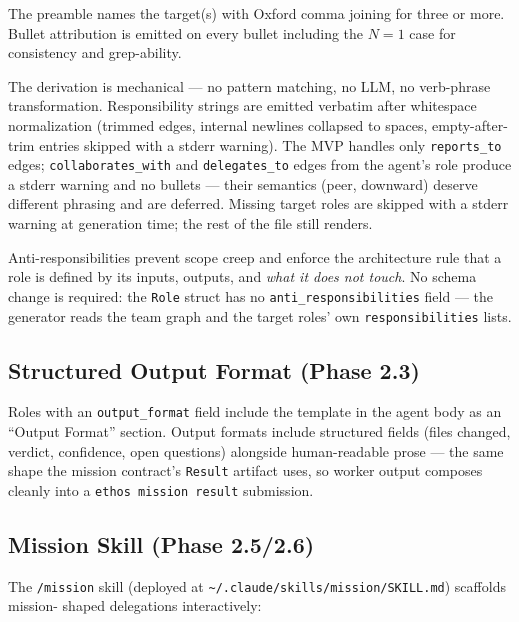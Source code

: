 \documentclass[a4paper,10pt]{article}
\newcommand{\field}[1]{\texttt{#1}}
\newcommand{\cmd}[1]{\texttt{#1}}
\newcommand{\fpath}[1]{\texttt{#1}}
\begin{document}
The preamble names the target(s) with Oxford comma joining for
three or more.  Bullet attribution is emitted on every bullet
including the $N{=}1$ case for consistency and grep-ability.

The derivation is mechanical --- no pattern matching, no LLM, no
verb-phrase transformation.  Responsibility strings are emitted
verbatim after whitespace normalization (trimmed edges, internal
newlines collapsed to spaces, empty-after-trim entries skipped
with a stderr warning).  The MVP handles only \texttt{reports\_to}
edges; \texttt{collaborates\_with} and \texttt{delegates\_to}
edges from the agent's role produce a stderr warning and no
bullets --- their semantics (peer, downward) deserve different
phrasing and are deferred.  Missing target roles are skipped with a
stderr warning at generation time; the rest of the file still
renders.

Anti-responsibilities prevent scope creep and enforce the
architecture rule that a role is defined by its inputs, outputs,
and \emph{what it does not touch}.  No schema change is required:
the \field{Role} struct has no \field{anti\_responsibilities}
field --- the generator reads the team graph and the target
roles' own \field{responsibilities} lists.

\subsection{Structured Output Format (Phase 2.3)}

Roles with an \field{output\_format} field include the template in
the agent body as an ``Output Format'' section.  Output formats
include structured fields (files changed, verdict, confidence,
open questions) alongside human-readable prose --- the same shape
the mission contract's \texttt{Result} artifact uses, so worker
output composes cleanly into a \cmd{ethos mission result}
submission.

\subsection{Mission Skill (Phase 2.5/2.6)}

The \cmd{/mission} skill (deployed at
\fpath{\~{}/.claude/skills/mission/SKILL.md}) scaffolds mission-
shaped delegations interactively:
\end{document}
